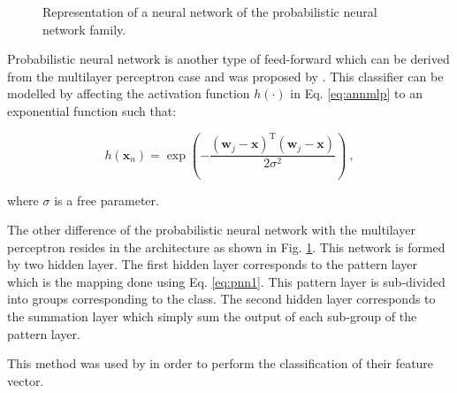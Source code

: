 \begin{enumerate}[leftmargin=*]
\begin{figure}
\caption{Representation of a neural network of the probabilistic neural network family.}
\label{fig:pnn}
\end{figure}

Probabilistic neural network is another type of feed-forward which can be derived from the multilayer perceptron case and was proposed by \cite{Specht1988}. This classifier can be modelled by affecting the activation function $h(\cdot)$ in Eq. \eqref{eq:annmlp} to an exponential function such that:

\begin{equation}
	h(\mathbf{x}_n) = \exp \left( - \frac{ (\mathbf{w}_j - \mathbf{x})^{\text{T}}(\mathbf{w}_j - \mathbf{x}) }{2\sigma^2} \right) \ ,
	\label{eq:pnn1}
\end{equation}

\noindent where $\sigma$ is a free parameter.

The other difference of the probabilistic neural network with the multilayer perceptron resides in the architecture as shown in Fig. \ref{fig:pnn}. This network is formed by two hidden layer. The first hidden layer corresponds to the pattern layer which is the mapping done using Eq. \eqref{eq:pnn1}. This pattern layer is sub-divided into groups corresponding to the class. The second hidden layer corresponds to the summation layer which simply sum the output of each sub-group of the pattern layer.

This method was used  by \cite{Ampeliotis2007,Ampeliotis2008,Viswanath2011} in order to perform the classification of their feature vector.


\end{enumerate}
